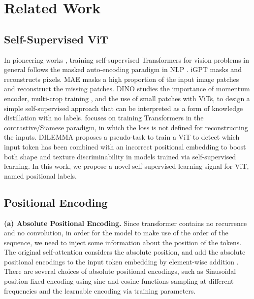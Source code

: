 \documentclass{article}
\begin{document}
\section{Related Work}

\subsection{Self-Supervised ViT}
In pioneering works \cite{pmlr-v119-chen20s,DBLP:journals/corr/abs-2111-06377}, training self-supervised Transformers for vision problems in general follows the masked auto-encoding paradigm in NLP \cite{DBLP:journals/corr/abs-1810-04805,NEURIPS2019_4496bf24}. iGPT \cite{pmlr-v119-chen20s} masks and reconstructs pixels. MAE \cite{DBLP:journals/corr/abs-2111-06377} masks a high proportion of the input image patches and reconstruct the missing patches. DINO \cite{Caron_2021_ICCV} studies the importance of momentum encoder, multi-crop training \cite{NEURIPS2020_70feb62b}, and the use of small patches with ViTs, to design a simple self-supervised approach that can be interpreted as a form of knowledge distillation with no labels. \cite{Chen_2021_ICCV} focuses on training Transformers in the contrastive/Siamese paradigm, in which the loss is not deﬁned for reconstructing the inputs. DILEMMA \cite{sameni2022dilemma} proposes a pseudo-task to train a ViT to detect which input token has been combined with an incorrect positional embedding to boost both shape and texture discriminability in models trained via self-supervised learning. In this work, we propose a novel self-supervised learning signal for ViT, named positional labels.

\subsection{Positional Encoding}
\noindent \textbf{(a) Absolute Positional Encoding.} Since transformer contains no recurrence and no convolution, in order for the model to make use of the order of the sequence, we need to inject some information about the position of the tokens. The original self-attention considers the absolute position, and add the absolute positional encodings to the input token embedding by element-wise addition \cite{NIPS2017_3f5ee243}. There are several choices of absolute positional encodings, such as Sinusoidal position \cite{NIPS2017_3f5ee243} fixed encoding using sine and cosine functions sampling at different frequencies and \cite{pmlr-v70-gehring17a} the learnable encoding via training parameters.
\end{document}

